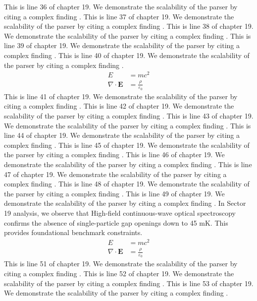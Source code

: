 This is line 36 of chapter 19. We demonstrate the scalability of the parser by citing a complex finding \cite{ref19_36}.
This is line 37 of chapter 19. We demonstrate the scalability of the parser by citing a complex finding \cite{ref19_37}.
This is line 38 of chapter 19. We demonstrate the scalability of the parser by citing a complex finding \cite{ref19_38}.
This is line 39 of chapter 19. We demonstrate the scalability of the parser by citing a complex finding \cite{ref19_39}.
This is line 40 of chapter 19. We demonstrate the scalability of the parser by citing a complex finding \cite{ref19_40}.
\begin{align*}
  E &= mc^2 \\
  \nabla \cdot \mathbf{E} &= \frac{\rho}{\varepsilon_0}
\end{align*}
This is line 41 of chapter 19. We demonstrate the scalability of the parser by citing a complex finding \cite{ref19_41}.
This is line 42 of chapter 19. We demonstrate the scalability of the parser by citing a complex finding \cite{ref19_42}.
This is line 43 of chapter 19. We demonstrate the scalability of the parser by citing a complex finding \cite{ref19_43}.
This is line 44 of chapter 19. We demonstrate the scalability of the parser by citing a complex finding \cite{ref19_44}.
This is line 45 of chapter 19. We demonstrate the scalability of the parser by citing a complex finding \cite{ref19_45}.
This is line 46 of chapter 19. We demonstrate the scalability of the parser by citing a complex finding \cite{ref19_46}.
This is line 47 of chapter 19. We demonstrate the scalability of the parser by citing a complex finding \cite{ref19_47}.
This is line 48 of chapter 19. We demonstrate the scalability of the parser by citing a complex finding \cite{ref19_48}.
This is line 49 of chapter 19. We demonstrate the scalability of the parser by citing a complex finding \cite{ref19_49}.
In Sector 19 analysis, we observe that High-field continuous-wave optical spectroscopy confirms the absence of single-particle gap openings down to 45 mK. This provides foundational benchmark constraints.
\begin{align*}
  E &= mc^2 \\
  \nabla \cdot \mathbf{E} &= \frac{\rho}{\varepsilon_0}
\end{align*}
This is line 51 of chapter 19. We demonstrate the scalability of the parser by citing a complex finding \cite{ref19_51}.
This is line 52 of chapter 19. We demonstrate the scalability of the parser by citing a complex finding \cite{ref19_52}.
This is line 53 of chapter 19. We demonstrate the scalability of the parser by citing a complex finding \cite{ref19_53}.
